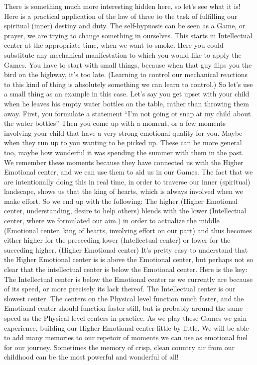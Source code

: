 \documentclass[12pt,letterpaper]{book}
\begin{document}
There is something much more interesting hidden here, so let's see what it is! Here is a practical application of the law of three to the task of fulfilling our spiritual (inner) destiny and duty. The self-hypnosis can be seen as a Game, or prayer, we are trying to change something in ourselves. This starts in Intellectual center at the appropriate time, when we want to smoke. Here you could substitute any mechanical manifestation to which you would like to apply the Games. You have to start with small things, because when that guy flips you the bird on the highway, it's too late. (Learning to control our mechanical reactions to this kind of thing is absolutely something we can learn to control.) So let's use a small thing as an example in this case. Let's say you get upset with your child when he leaves his empty water bottles on the table, rather than throwing them away. First, you formulate a statement ``I'm not going ot snap at my child about the water bottles'' Then you come up with a moment, or a few moments involving your child that have a very strong emotional quality for you. Maybe when they run up to you wanting to be picked up. These can be more general too, maybe how wonderful it was spending the summer with them in the past. We remember these moments because they have connected us with the Higher Emotional center, and we can use them to aid us in our Games. The fact that we are intentionally doing this in real time, in order to traverse our inner (spiritual) landscape, shows us that the king of hearts, which is always involved when we make effort. So we end up with the following: The higher (Higher Emotional center, understanding, desire to help others) blends with the lower (Intellectual center, where we formulated our aim.) in order to actualize the middle (Emotional center, king of hearts, involving effort on our part) and thus becomes either higher for the preceeding lower (Intellectual center) or lower for the suceeding higher. (Higher Emotional center) It's pretty easy to understand that the Higher Emotional center is is above the Emotional center, but perhaps not so clear that the intellectual center is below the Emotional center. Here is the key: The Intellectual center is below the Emotional center as we currently are because of its speed, or more precisely its lack thereof. The Intellectual center is our slowest center. The centers on the Physical level function much faster, and the Emotional center should function faster still, but is probably around the same speed as the Physical level centers in practice.  As we play these Games we gain experience, building our Higher Emotional center little by little. We will be able to add many memories to our repetoir of moments we can use as emotional fuel for our journey. Sometimes the memory of crisp, clean country air from our childhood can be the most powerful and wonderful of all!
\end{document}
